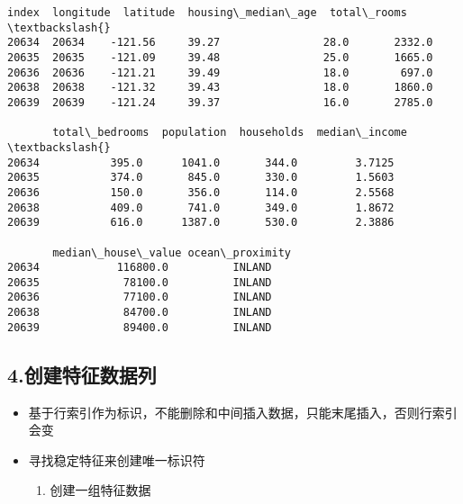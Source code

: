 \documentclass[11pt]{article}
\makeatletter
\providecommand{\tightlist}{%
      \setlength{\itemsep}{0pt}\setlength{\parskip}{0pt}}
\newcommand{\boxspacing}{\kern\kvtcb@left@rule\kern\kvtcb@boxsep}
\newcommand{\prompt}[4]{
        \ttfamily\llap{{\color{#2}[#3]:\hspace{3pt}#4}}\vspace{-\baselineskip}
    }
\makeatother
\begin{document}
            \begin{tcolorbox}[breakable, size=fbox, boxrule=.5pt, pad at break*=1mm, opacityfill=0]
\prompt{Out}{outcolor}{15}{\boxspacing}
\begin{Verbatim}[commandchars=\\\{\}]
       index  longitude  latitude  housing\_median\_age  total\_rooms  \textbackslash{}
20634  20634    -121.56     39.27                28.0       2332.0
20635  20635    -121.09     39.48                25.0       1665.0
20636  20636    -121.21     39.49                18.0        697.0
20638  20638    -121.32     39.43                18.0       1860.0
20639  20639    -121.24     39.37                16.0       2785.0

       total\_bedrooms  population  households  median\_income  \textbackslash{}
20634           395.0      1041.0       344.0         3.7125
20635           374.0       845.0       330.0         1.5603
20636           150.0       356.0       114.0         2.5568
20638           409.0       741.0       349.0         1.8672
20639           616.0      1387.0       530.0         2.3886

       median\_house\_value ocean\_proximity
20634            116800.0          INLAND
20635             78100.0          INLAND
20636             77100.0          INLAND
20638             84700.0          INLAND
20639             89400.0          INLAND
\end{Verbatim}
\end{tcolorbox}
        
    \hypertarget{ux521bux5efaux7279ux5f81ux6570ux636eux5217}{%
\subsection{4.创建特征数据列}\label{ux521bux5efaux7279ux5f81ux6570ux636eux5217}}

\begin{itemize}
\tightlist
\item
  基于行索引作为标识，不能删除和中间插入数据，只能末尾插入，否则行索引会变
\item
  寻找稳定特征来创建唯一标识符

  \begin{enumerate}
  \def\labelenumi{\arabic{enumi}.}
  \tightlist
  \item
    创建一组特征数据
  \end{enumerate}
\end{itemize}
\end{document}
